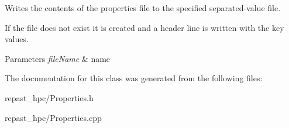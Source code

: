 Writes the contents of the properties file to the specified separated-\/value file. 

If the file does not exist it is created and a header line is written with the key values.


\begin{DoxyParams}{Parameters}
{\em file\-Name} & name \\
\hline
\end{DoxyParams}


The documentation for this class was generated from the following files\-:\begin{DoxyCompactItemize}
\item 
repast\-\_\-hpc/Properties.\-h\item 
repast\-\_\-hpc/Properties.\-cpp\end{DoxyCompactItemize}
